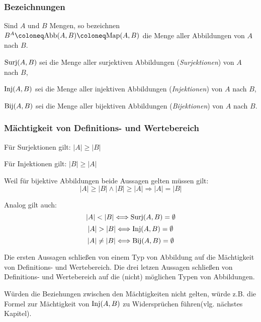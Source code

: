 \newpage

\subsubsection{Bezeichnungen}
\begin{description}
\item Sind $A$ und $B$ Mengen, so bezeichnen $B^A \coloneq \text{Abb}(A,B)
\coloneq \Map(A,B)$ die Menge aller Abbildungen von $A$ nach $B$.
\item $\text{Surj}(A,B)$ sei die Menge aller surjektiven Abbildungen
(\emph{Surjektionen}) von $A$ nach $B$,
\item $\text{Inj}(A,B)$ sei die Menge aller injektiven Abbildungen
(\emph{Injektionen}) von $A$ nach $B$,
\item $\text{Bij}(A,B)$ sei die Menge aller bijektiven Abbildungen
(\emph{Bijektionen}) von $A$ nach $B$.
\end{description}


\subsubsection{Mächtigkeit von Definitions- und Wertebereich}

Für Surjektionen gilt: $|A| \geq |B|$

Für Injektionen gilt: $|B| \geq |A|$

Weil für bijektive Abbildungen beide Aussagen gelten müssen gilt:
$$|A| \geq |B| \wedge |B| \geq |A| \Rightarrow |A| = |B| $$


Analog gilt auch:
$$ |A|<|B| \Longleftrightarrow \Surj(A,B) = \emptyset $$
$$ |A|>|B| \Longleftrightarrow \Inj(A,B) = \emptyset $$
$$ |A| \neq |B| \Longleftrightarrow \text{Bij}(A,B) = \emptyset $$

Die ersten Aussagen schließen von einem Typ von Abbildung auf die Mächtigkeit von Definitions- und Wertebereich.
Die drei letzen Aussagen schließen von Definitions- und Wertebereich auf die (nicht) möglichen Typen von Abbildungen.

Würden die Beziehungen zwischen den Mächtigkeiten nicht gelten, würde z.B. die
Formel zur Mächtigkeit von $\text{Inj}(A,B)$ zu Widersprüchen führen(vlg. nächstes
Kapitel).
